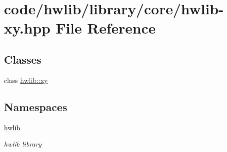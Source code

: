 \hypertarget{hwlib-xy_8hpp}{}\section{code/hwlib/library/core/hwlib-\/xy.hpp File Reference}
\label{hwlib-xy_8hpp}
\subsection*{Classes}
\begin{DoxyCompactItemize}
\item 
class \hyperlink{classhwlib_1_1xy}{hwlib\+::xy}
\end{DoxyCompactItemize}
\subsection*{Namespaces}
\begin{DoxyCompactItemize}
\item 
 \hyperlink{namespacehwlib}{hwlib}
\begin{DoxyCompactList}\small\item\em hwlib library \end{DoxyCompactList}\end{DoxyCompactItemize}

